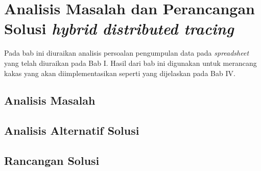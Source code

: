 \chapter{Analisis Masalah dan Perancangan Solusi \textit{hybrid distributed tracing}}

Pada bab ini diuraikan analisis persoalan pengumpulan data pada \textit{spreadsheet} yang telah diuraikan pada Bab I. Hasil dari bab ini digunakan untuk merancang kakas yang akan diimplementasikan seperti yang dijelaskan pada Bab IV.


\section{Analisis Masalah}


\section{Analisis Alternatif Solusi}

\section{Rancangan Solusi}